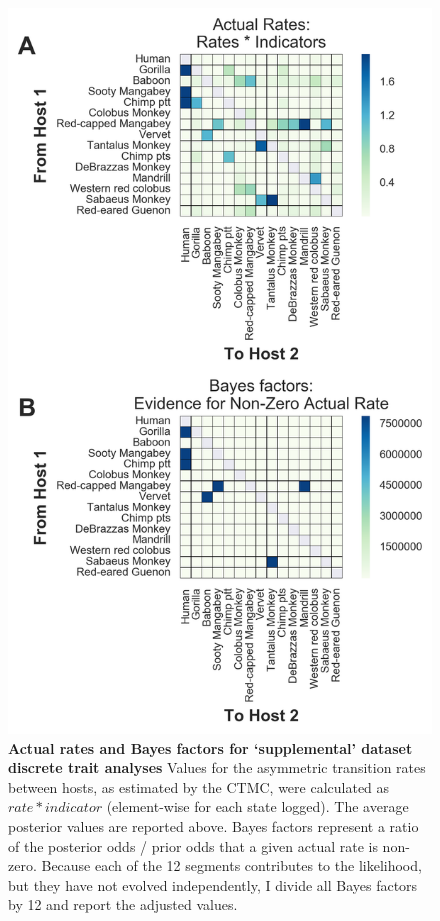 \begin{figure}[ht!]
  \begin{centering}
    \includegraphics[width=.6\linewidth]{./png/siv_suppdata_transmissions.png}
  	\caption[Pairwise host transmission rates (`supplemental' dataset)]{\textbf{Actual rates and Bayes factors for `supplemental' dataset discrete trait analyses }
Values for the asymmetric transition rates between hosts, as estimated by the CTMC, were calculated as $rate * indicator$ (element-wise for each state logged).
The average posterior values are reported above.
Bayes factors represent a ratio of the posterior odds / prior odds that a given actual rate is non-zero.
Because each of the 12 segments contributes to the likelihood, but they have not evolved independently, I divide all Bayes factors by 12 and report the adjusted values.
        }
  	\label{siv_suppdata_transmissions}
  \end{centering}
\end{figure}

